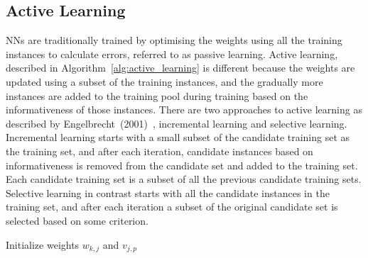 \documentclass[conference]{IEEEtran}
\begin{document}
	\subsection{Active Learning}
	NNs are traditionally trained by optimising the weights using all the training instances to calculate errors, referred to as passive learning. Active learning, described in Algorithm~\ref{alg:active_learning} is different because the weights are updated using a subset of the training instances, and the gradually more instances are added to the training pool during training based on the informativeness of those instances. There are two approaches to active learning as described by Engelbrecht~(2001)~\cite{sasla}, incremental learning and selective learning. Incremental learning starts with a small subset of the candidate training set as the training set, and after each iteration, candidate instances based on informativeness is removed from the candidate set and added to the training set. Each candidate training set is a subset of all the previous candidate training sets. Selective learning in contrast starts with all the candidate instances in the training set, and after each iteration a subset of the original candidate set is selected based on some criterion.
	\begin{algorithm}
		\caption{Active Learning}
		\label{alg:active_learning}
		
		
		Initialize weights $w_{k, j}$ and $v_{j, p}$\;
		
	\end{algorithm}
	
\end{document}
